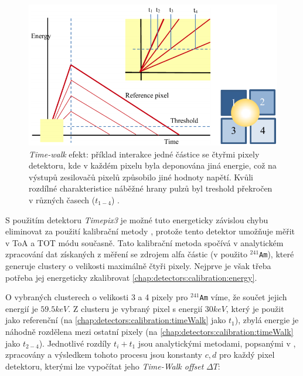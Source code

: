 \begin{figure}
	\begin{center}
		\includegraphics[width=12cm]{figures/calib_timeWalk.png}
		\caption{\textit{Time-walk} efekt: příklad interakce jedné částice se čtyřmi pixely detektoru, kde v každém pixelu byla deponována jiná energie, což na výstupů zesilovačů pixelů způsobilo jiné hodnoty napětí. Kvůli rozdílné charakteristice náběžné hrany pulzů byl treshold překročen v různých časech ($t_{1-4}$) \cite{Turecek2016TimeWakl}.}
		\label{fig:det:calib:timeWalk}
	\end{center}
\end{figure}

S použitím detektoru \textit{Timepix3}\cite{timepix3} je možné tuto energeticky závislou chybu eliminovat za použití kalibrační metody \cite{Turecek2016TimeWakl}, protože tento detektor umožňuje měřit v ToA a TOT módu současně. Tato kalibrační metoda spočívá v analytickém zpracování dat získaných z měření se zdrojem alfa částic (v \cite{Turecek2016TimeWakl} použito $^{241}$\texttt{Am}), které generuje clustery o velikosti maximálně čtyři pixely. Nejprve je však třeba potřeba jej energeticky zkalibrovat \ref{chap:detectors:calibration:energy}. 

O vybraných clusterech o velikosti 3 a 4 pixely pro $^{241}$\texttt{Am} víme, že součet jejich energií je $59.5keV$. Z clusteru je vybraný pixel s energií $30keV$, který je použit jako referenční (na \ref{chap:detectors:calibration:timeWalk} jako $t_1$), zbylá energie je náhodně rozdělena mezi ostatní pixely (na \ref{chap:detectors:calibration:timeWalk} jako $t_{2-4}$). Jednotlivé rozdíly $t_i+t_1$ jsou analytickými metodami, popsanými v \cite{Turecek2016TimeWakl}, zpracovány a výsledkem tohoto procesu jsou konstanty $c,d$ pro každý pixel detektoru, kterými lze vypočítat jeho \textit{Time-Walk offset} $\Delta T$:

